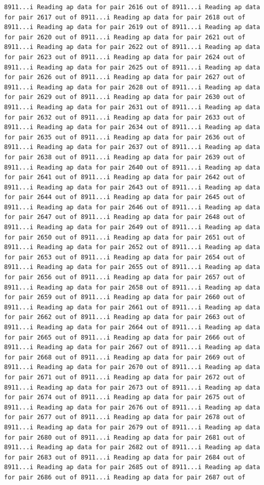 \documentclass[
]{article}
\begin{document}
\begin{verbatim}
8911...i Reading ap data for pair 2616 out of 8911...i Reading ap data for pair 2617 out of 8911...i Reading ap data for pair 2618 out of 8911...i Reading ap data for pair 2619 out of 8911...i Reading ap data for pair 2620 out of 8911...i Reading ap data for pair 2621 out of 8911...i Reading ap data for pair 2622 out of 8911...i Reading ap data for pair 2623 out of 8911...i Reading ap data for pair 2624 out of 8911...i Reading ap data for pair 2625 out of 8911...i Reading ap data for pair 2626 out of 8911...i Reading ap data for pair 2627 out of 8911...i Reading ap data for pair 2628 out of 8911...i Reading ap data for pair 2629 out of 8911...i Reading ap data for pair 2630 out of 8911...i Reading ap data for pair 2631 out of 8911...i Reading ap data for pair 2632 out of 8911...i Reading ap data for pair 2633 out of 8911...i Reading ap data for pair 2634 out of 8911...i Reading ap data for pair 2635 out of 8911...i Reading ap data for pair 2636 out of 8911...i Reading ap data for pair 2637 out of 8911...i Reading ap data for pair 2638 out of 8911...i Reading ap data for pair 2639 out of 8911...i Reading ap data for pair 2640 out of 8911...i Reading ap data for pair 2641 out of 8911...i Reading ap data for pair 2642 out of 8911...i Reading ap data for pair 2643 out of 8911...i Reading ap data for pair 2644 out of 8911...i Reading ap data for pair 2645 out of 8911...i Reading ap data for pair 2646 out of 8911...i Reading ap data for pair 2647 out of 8911...i Reading ap data for pair 2648 out of 8911...i Reading ap data for pair 2649 out of 8911...i Reading ap data for pair 2650 out of 8911...i Reading ap data for pair 2651 out of 8911...i Reading ap data for pair 2652 out of 8911...i Reading ap data for pair 2653 out of 8911...i Reading ap data for pair 2654 out of 8911...i Reading ap data for pair 2655 out of 8911...i Reading ap data for pair 2656 out of 8911...i Reading ap data for pair 2657 out of 8911...i Reading ap data for pair 2658 out of 8911...i Reading ap data for pair 2659 out of 8911...i Reading ap data for pair 2660 out of 8911...i Reading ap data for pair 2661 out of 8911...i Reading ap data for pair 2662 out of 8911...i Reading ap data for pair 2663 out of 8911...i Reading ap data for pair 2664 out of 8911...i Reading ap data for pair 2665 out of 8911...i Reading ap data for pair 2666 out of 8911...i Reading ap data for pair 2667 out of 8911...i Reading ap data for pair 2668 out of 8911...i Reading ap data for pair 2669 out of 8911...i Reading ap data for pair 2670 out of 8911...i Reading ap data for pair 2671 out of 8911...i Reading ap data for pair 2672 out of 8911...i Reading ap data for pair 2673 out of 8911...i Reading ap data for pair 2674 out of 8911...i Reading ap data for pair 2675 out of 8911...i Reading ap data for pair 2676 out of 8911...i Reading ap data for pair 2677 out of 8911...i Reading ap data for pair 2678 out of 8911...i Reading ap data for pair 2679 out of 8911...i Reading ap data for pair 2680 out of 8911...i Reading ap data for pair 2681 out of 8911...i Reading ap data for pair 2682 out of 8911...i Reading ap data for pair 2683 out of 8911...i Reading ap data for pair 2684 out of 8911...i Reading ap data for pair 2685 out of 8911...i Reading ap data for pair 2686 out of 8911...i Reading ap data for pair 2687 out of 
\end{verbatim}
\end{document}
